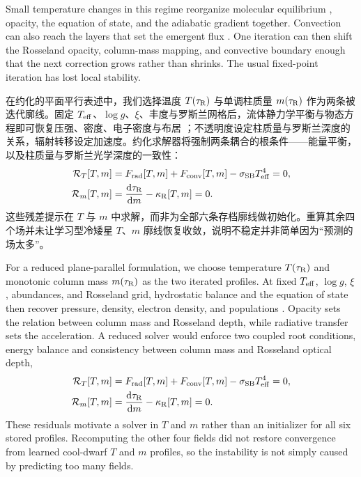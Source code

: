 \begin{EN}
Small temperature changes in this regime reorganize molecular equilibrium
\citep{BarklemCollet2016}, opacity, the equation of state, and the adiabatic
gradient together. Convection can also reach the layers that set the emergent
flux \citep{Gustafsson2008}. One iteration
can then shift the Rosseland opacity, column-mass mapping, and convective
boundary enough that the next correction grows rather than shrinks. The usual
fixed-point iteration has lost local stability.
\end{EN}

在约化的平面平行表述中，我们选择温度 $T(\tau_{\rm R})$ 与单调柱质量 $m(\tau_{\rm R})$ 作为两条被迭代廓线。固定 $T_{\rm eff}$、$\log g$、$\xi$、丰度与罗斯兰网格后，流体静力学平衡与物态方程即可恢复压强、密度、电子密度与布居 \citep{HubenyMihalas2014}；不透明度设定柱质量与罗斯兰深度的关系，辐射转移设定加速度。约化求解器将强制两条耦合的根条件——能量平衡，以及柱质量与罗斯兰光学深度的一致性：
\begin{equation}
\begin{aligned}
\mathcal{R}_{T}[T,m]
&=F_{\rm rad}[T,m]+F_{\rm conv}[T,m]
-\sigma_{\rm SB}T_{\rm eff}^{4}=0,\\
\mathcal{R}_{m}[T,m]
&=\frac{\mathrm{d}\tau_{\rm R}}{\mathrm{d}m}-\kappa_{\rm R}[T,m]=0 .
\end{aligned}
\end{equation}
\noindent 这些残差提示在 $T$ 与 $m$ 中求解，而非为全部六条存档廓线做初始化。重算其余四个场并未让学习型冷矮星 $T$、$m$ 廓线恢复收敛，说明不稳定并非简单因为“预测的场太多”。

\begin{EN}
For a reduced plane-parallel formulation, we choose temperature
$T(\tau_{\rm R})$ and monotonic column mass $m(\tau_{\rm R})$ as the two
iterated profiles. At fixed $T_{\rm eff}$, $\log g$, $\xi$, abundances, and
Rosseland grid, hydrostatic balance and the equation of state then recover
pressure, density, electron density, and populations
\citep{HubenyMihalas2014}. Opacity
sets the relation between column mass and Rosseland depth, while radiative
transfer sets the acceleration. A reduced solver would enforce two coupled root
conditions, energy balance and consistency between column mass and Rosseland
optical depth,
\begin{equation}
\begin{aligned}
\mathcal{R}_{T}[T,m]
&=F_{\rm rad}[T,m]+F_{\rm conv}[T,m]
-\sigma_{\rm SB}T_{\rm eff}^{4}=0,\\
\mathcal{R}_{m}[T,m]
&=\frac{\mathrm{d}\tau_{\rm R}}{\mathrm{d}m}-\kappa_{\rm R}[T,m]=0 .
\end{aligned}
\end{equation}
\noindent These residuals motivate a solver in $T$ and $m$ rather than an
initializer for all six stored profiles. Recomputing the other four fields did
not restore convergence from learned cool-dwarf $T$ and $m$ profiles, so the
instability is not simply caused by predicting too many fields.
\end{EN}

